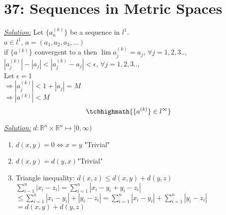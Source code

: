\documentclass{amsbook}
\begin{document}
\section{37: Sequences in Metric Spaces}
\begin{tcolorbox}[enhanced,attach boxed title to top center={yshift=-3mm,yshifttext=-1mm},
  colback=blue!5!white,colframe=blue!75!black,colbacktitle=red!80!black,
  title=Exercise 37.7:,fonttitle=\bfseries,
  boxed title style={size=small,colframe=red!50!black} ]
 \textit{\color{blue}\underline{Solution:}}
 Let $\{a_n^{(k)}\}$ be a sequence in $l^1$.\\
 $a\in l^1$, $a=(a_1,a_2,a_3,...)$\\
 if $\{a^{(k)}\}$ convergent to a then $\lim a_j^{(k)}=a_j$, $\forall j=1,2,3..,$\\
 $|a_j^{(k)}|-|a_j|<|a_j^{(k)}-a_j|<\epsilon$, $\forall j=1,2,3..,$\\
 Let $\epsilon =1$\\
 $\Rightarrow|a_j^{(k)}|<1+|a_j|=M$\\
 $\Rightarrow |a^{(k)}|<M$
 $$\tcbhighmath{\{a^{(k)}\}\in l^\infty}$$
\end{tcolorbox}



\begin{tcolorbox}[enhanced,attach boxed title to top center={yshift=-3mm,yshifttext=-1mm},
  colback=blue!5!white,colframe=blue!75!black,colbacktitle=red!80!black,
  title=Exercise 37.9 (a): ,fonttitle=\bfseries,
  boxed title style={size=small,colframe=red!50!black} ]
   \textit{\color{blue}\underline{Solution:}}
  $d:\mathbb{R}^n\times \mathbb{R}^n\longmapsto[0,\infty )$
   \begin{enumerate}
       \item $d(x,y)=0\Leftrightarrow x=y$ {\color{red}"Trivial"} 
       \item $d(x,y)=d(y,x)${\color{red}"Trivial"}
       \item Triangle inequality: $d(x,z)\leq d(x,y)+d(y,z)$\\
       $\sum_{i-1}^{n}|x_i-z_i|=\sum_{i=1}^{n}|x_i-y_i+y_i-z_i|$
       $\leq \sum_{i=1}^{n}|x_i-y_i|+|y_i-z_i|= \sum_{i=1}^{n}|x_i-y_i|+\sum_{i=1}^{n}|y_i-z_i|$
       $=d(x,y)+d(y,z)$
       
   \end{enumerate}
\end{tcolorbox}

\end{document}

